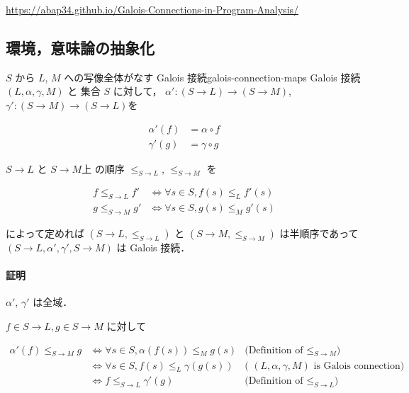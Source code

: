 \documentclass[uplatex]{jsarticle}
\begin{document}
\url{https://abap34.github.io/Galois-Connections-in-Program-Analysis/}

\subsection{環境，意味論の抽象化}

\begin{boxtheorem}{$S$ から $L$, $M$ への写像全体がなす Galois 接続}{galois-connection-maps}
  Galois 接続 $(L, \alpha, \gamma, M)$ と 集合 $S$ に対して，
  $\alpha': (S \to L) \to (S \to M)$,$\gamma': (S \to M) \to (S \to L)$を

  \begin{align*}
    \alpha'(f) & = \alpha \circ f \\
    \gamma'(g) & = \gamma \circ g
  \end{align*}

  $S \to L$ と $S \to M$上 の順序 $\leq_{S \to L}$, $\leq_{S \to M}$ を

  \begin{align*}
    f \leq_{S \to L} f' & \iff \forall s \in S, f(s) \leq_L f'(s) \\
    g \leq_{S \to M} g' & \iff \forall s \in S, g(s) \leq_M g'(s)
  \end{align*}

  によって定めれば $(S \to L, \leq_{S \to L})$ と $(S \to M, \leq_{S \to M})$ は半順序であって
  $(S \to L, \alpha', \gamma', S \to M)$ は Galois 接続．
\end{boxtheorem}

\paragraph*{証明}

$\alpha'$, $\gamma'$ は全域．


$f \in S \to L, g \in S \to M$ に対して

\begin{align*}
  \alpha'(f) \leq_{S \to M} g & \iff \forall s \in S, \alpha(f(s)) \leq_M g(s) & \text{(Definition of $\leq_{S \to M}$)}                 \\
                              & \iff \forall s \in S, f(s) \leq_L \gamma(g(s)) & \text{( $(L, \alpha, \gamma, M)$ is Galois connection)} \\
                              & \iff f \leq_{S \to L} \gamma'(g)               & \text{(Definition of $\leq_{S \to L}$)}                 \\
  \\
\end{align*}
\end{document}
